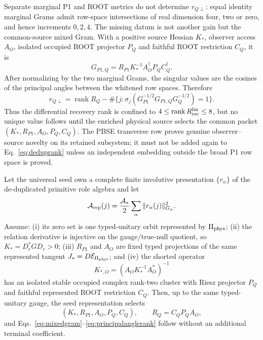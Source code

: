 Separate marginal P1 and ROOT metrics do not determine $r_{Q\perp}$: equal
identity marginal Grams admit row-space intersections of real dimension four,
two or zero, and hence increments $0,2,4$.  The missing datum is not another
gain but the common-source mixed Gram.  With a positive source Hessian $K_*$,
observer access $A_O$, isolated occupied ROOT projector $P_Q$ and faithful
ROOT restriction $C_Q$, it is
\begin{equation}
G_{P1,Q}=R_{P1}K_*^{-1}A_O^\dagger P_QC_Q^\dagger.
\label{eq:mixedgram}
\end{equation}
After normalizing by the two marginal Grams, the singular values are the
cosines of the principal angles between the whitened row spaces.  Therefore
\begin{equation}
r_{Q\perp}=\operatorname{rank}R_Q
-\#\{j:\sigma_j(G_{P1}^{-1/2}G_{P1,Q}G_Q^{-1/2})=1\}.
\label{eq:principalanglerank}
\end{equation}
Thus the differential recovery rank is confined to $4\le
\operatorname{rank}R_{\rm rec}^{\rm lin}\le8$, but no unique value follows
until the enriched physical source selects the common packet
$(K_*,R_{P1},A_O,P_Q,C_Q)$.  The PBSE transverse row proves genuine
observer--source novelty on its retained subsystem; it must not be added again
to Eq.~\eqref{eq:deduprank} unless an independent embedding outside the broad
P1 row space is proved.

\begin{proposition}
\label{prop:seedselector}
Let the universal seed own a complete finite involutive presentation
$\{r_\alpha\}$ of the de-duplicated primitive role algebra and let
\begin{equation}
\mathcal A_{\rm rep}(j)
=\frac{\mathcal A_*}{2}\sum_\alpha
\|r_\alpha(j)\|_{G_\alpha}^2.
\label{eq:seedrepaction}
\end{equation}
Assume: (i) its zero set is one typed-unitary orbit represented by
$\Pi_{\rm phys}$; (ii) the relation derivative is injective on the
gauge/true-null quotient, so $K_*=D_r^*GD_r>0$; (iii) $R_{P1}$ and $A_O$ are
fixed typed projections of the same represented tangent
$J_*=D\mathcal E_{\Pi_{\rm phys}}$; and (iv) the shorted operator
\begin{equation}
K_{*,O}=(A_OK_*^{-1}A_O^*)^{-1}
\label{eq:shortedsource}
\end{equation}
has an isolated stable occupied complex rank-two cluster with Riesz projector
$P_Q$ and faithful represented ROOT restriction $C_Q$.  Then, up to the same
typed-unitary gauge, the seed representation selects
\begin{equation}
(K_*,R_{P1},A_O,P_Q,C_Q),
\qquad R_Q=C_QP_QA_O,
\label{eq:selectedpacket}
\end{equation}
and Eqs.~\eqref{eq:mixedgram}--\eqref{eq:principalanglerank} follow without
an additional terminal coefficient.
\end{proposition}

